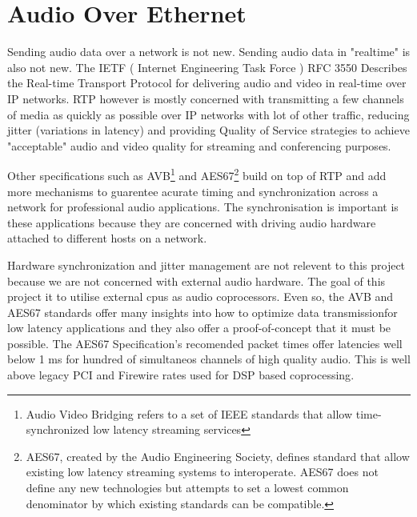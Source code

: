 \section{Audio Over Ethernet}

Sending audio data over a network is not new. Sending audio data in "realtime" is also not new. The IETF ( Internet Engineering Task Force ) RFC 3550 Describes the Real-time Transport Protocol for delivering audio and video in real-time over IP networks. RTP however is mostly concerned with transmitting a few channels of media as quickly as possible over IP networks with lot of other traffic, reducing jitter (variations in latency) and providing Quality of Service strategies to achieve "acceptable" audio and video quality for streaming and conferencing purposes.

Other specifications such as AVB\footnote{Audio Video Bridging refers to a set of IEEE standards that allow time-synchronized low latency streaming services } and AES67\footnote{AES67, created by the Audio Engineering Society, defines standard that allow existing low latency streaming systems to interoperate. AES67 does not define any new technologies but attempts to set a lowest common denominator by which existing standards can be compatible. } build on top of RTP and add more mechanisms to guarentee acurate timing and synchronization across a network for professional audio applications. The synchronisation is important is these applications because they are concerned with driving audio hardware attached to different hosts on a network.

Hardware synchronization and jitter management are not relevent to this project because we are not concerned with external audio hardware. The goal of this project it to utilise external cpus as audio coprocessors. Even so, the AVB and AES67 standards offer many insights into how to optimize data transmissionfor low latency applications and they also offer a proof-of-concept that it must be possible. The AES67 Specification's recomended packet times offer latencies well below 1 ms for hundred of simultaneos channels of high quality audio. This is well above legacy PCI and Firewire rates used for DSP based coprocessing\cite{bouillot2009aes}.
